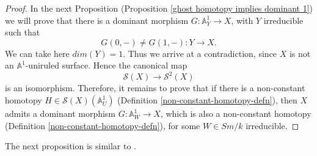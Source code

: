 \documentclass[11pt, reqno]{amsart}
\theoremstyle{plain}
\theoremstyle{definition}
\newcommand{\sS}{{\mathcal S}}
\newcommand{\A}{{\mathbb A}}
\begin{document}
\begin{proof}
In the next Proposition (Proposition \ref{ghost homotopy implies dominant 1}) we will prove that there is a dominant morphism $G: \mathbb{A}^1_Y \to X$, with $Y$ irreducible such that 
$$G(0, -) \neq G(1, -): Y \to X.$$ 
We can take here $dim(Y) = 1$. Thus we arrive at a contradiction, since $X$ is not an $\mathbb{A}^1$-uniruled surface. Hence the canonical map
$$\mathcal{S}(X) \to \mathcal{S}^2(X)$$
is an isomorphism.
Therefore, it remains to prove that if there is a non-constant homotopy $H \in \sS(X)(\A^1_U)$ (Definition \ref{non-constant-homotopy-defn}), then $X$ admits a dominant morphism $G: \A^1_W \to X$, which is also a non-constant homotopy (Definition \ref{non-constant-homotopy-defn}), for some $W \in Sm/k$ irreducible.

\end{proof}
The next proposition is similar to \cite[Proposition 2.9]{choudhury2}. 
\end{document}
